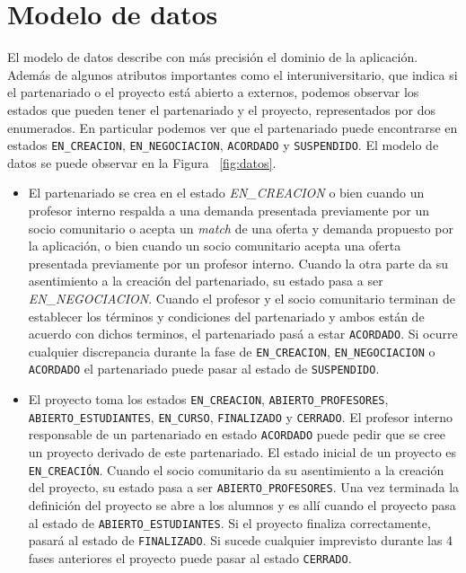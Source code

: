 \documentclass[11pt]{book}
\begin{document}
	\section{Modelo de datos}
	El modelo de datos describe con más precisión el dominio de la aplicación.
	Además de algunos atributos importantes como el interuniversitario, que indica si el partenariado o el proyecto está abierto a externos, podemos observar los estados que pueden tener el partenariado y el proyecto, representados por dos enumerados. En particular podemos ver que el partenariado puede encontrarse en estados \texttt{EN\_CREACION}, \texttt{EN\_NEGOCIACION}, \texttt{ACORDADO} y \texttt{SUSPENDIDO}. El modelo de datos se puede observar en la Figura ~\ref{fig:datos}.\\
	\begin{itemize} 
		\item El partenariado se crea en el estado \textit{EN\_CREACION} o bien cuando un
		profesor interno respalda a una demanda presentada previamente por un
		socio comunitario o acepta un \textit{match} de una oferta y demanda propuesto
		por la aplicación, o bien cuando un socio comunitario acepta una oferta
		presentada previamente por un profesor interno. Cuando la otra parte da su asentimiento a la creación del partenariado, su estado pasa a ser \textit{EN\_NEGOCIACION}. Cuando el profesor y el socio comunitario terminan de establecer los términos y condiciones del partenariado y ambos están de acuerdo con dichos terminos, el partenariado pasá a estar \texttt{ACORDADO}. Si ocurre cualquier discrepancia durante la fase de \texttt{EN\_CREACION}, \texttt{EN\_NEGOCIACION} o \texttt{ACORDADO} el partenariado puede pasar al estado de \texttt{SUSPENDIDO}.
		\item El proyecto toma los estados \texttt{EN\_CREACION}, \texttt{ABIERTO\_PROFESORES}, \texttt{ABIERTO\_ESTUDIANTES}, \texttt{EN\_CURSO}, \texttt{FINALIZADO} y \texttt{CERRADO}.
		El profesor interno responsable de un partenariado en estado \texttt{ACORDADO}  puede pedir que se cree un proyecto derivado de este partenariado. El
		estado inicial de un proyecto es \texttt{EN\_CREACIÓN}. Cuando el socio
		comunitario da su asentimiento a la creación del proyecto, su estado
		pasa a ser \texttt{ABIERTO\_PROFESORES}. Una vez terminada la definición del proyecto se abre a los alumnos y es allí cuando el proyecto pasa al estado de \texttt{ABIERTO\_ESTUDIANTES}. Si el proyecto finaliza correctamente, pasará al estado de \texttt{FINALIZADO}. Si sucede cualquier imprevisto durante las 4 fases anteriores el proyecto puede pasar al estado \texttt{CERRADO}.
	\end{itemize} 
	
\end{document}
